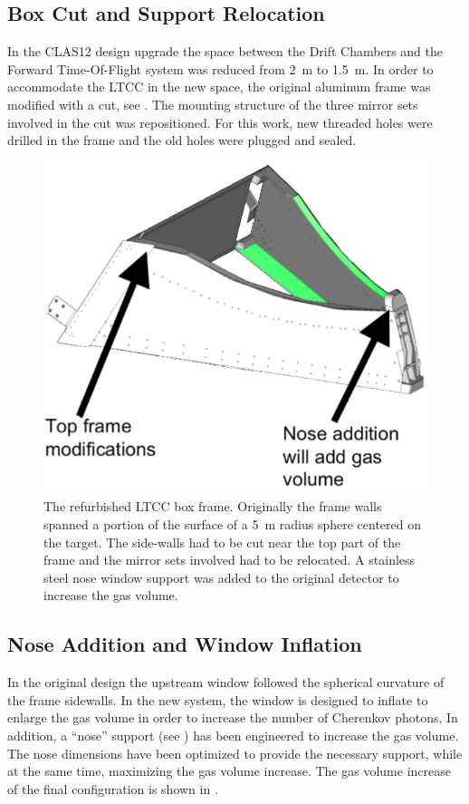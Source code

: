 \subsection{Box Cut and Support Relocation}
\label{sec:mirrorRepos}

In the CLAS12 design upgrade the space between the Drift Chambers and the Forward Time-Of-Flight system
was reduced from 2~m to 1.5~m. In order to accommodate the LTCC in the new space, the original aluminum frame
was modified with a cut, see . The mounting structure of the three mirror sets involved in the cut was
repositioned. For this work, new threaded holes were drilled in the frame and the old holes were plugged and sealed.

\begin{figure}[ht]
	\centering
	\includegraphics[width=1.0\columnwidth, height=0.75\columnwidth]{img/boxCut.png}
	\caption{The refurbished LTCC box frame. Originally the frame walls spanned a portion of the surface of a 5~m
          radius sphere centered on the target. The side-walls had to be cut near the top part of the frame and the mirror
          sets involved had to be relocated. A stainless steel nose window support was added to the original detector to
          increase the gas volume.}
	\label{fig:boxCut}
\end{figure}

\subsection{Nose Addition and Window Inflation}

In the original design the upstream window followed the spherical curvature of the frame sidewalls. In the new system,
the window is designed to inflate to enlarge the gas volume in order to increase the number of Cherenkov photons. In
addition, a ``nose'' support (see ) has been engineered to increase the gas volume. The nose dimensions have
been optimized to provide the necessary support, while at the same time, maximizing the gas volume increase. The gas
volume increase of the final configuration is shown in .

